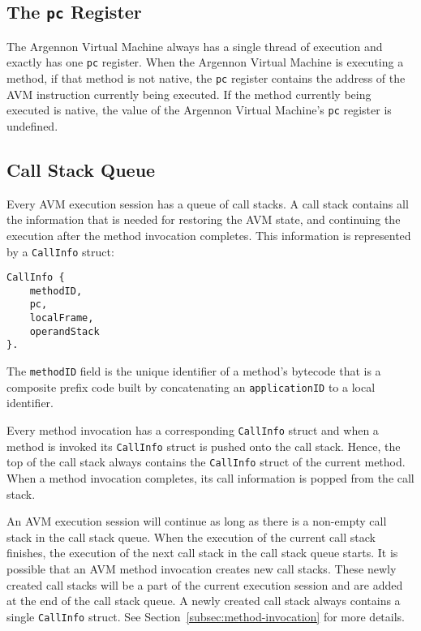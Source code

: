 \subsection{The \texttt{pc} Register}\label{subsec:the-pc-register}

The Argennon Virtual Machine always has a single thread of execution and exactly has one \texttt{pc} register.
When the Argennon Virtual Machine is executing a method, if that method is not native, the \texttt{pc} register
contains the address of the AVM instruction currently being executed. If the method currently being executed
is native, the value of the Argennon Virtual Machine's \texttt{pc} register is undefined.

\subsection{Call Stack Queue}\label{subsec:call-stack}

Every AVM execution session has a queue of call stacks. A call stack contains all the information that is needed for
restoring the AVM state, and continuing the execution after the method invocation completes.
This information is represented by a \texttt{CallInfo} struct:
\begin{verbatim}
CallInfo {
    methodID,
    pc,
    localFrame,
    operandStack
}.
\end{verbatim}

The \texttt{methodID} field is the unique identifier of a method's bytecode that
is a composite prefix code built by concatenating an \texttt{applicationID} to
a local identifier.

Every method invocation has a corresponding \texttt{CallInfo} struct and when a method is invoked its
\texttt{CallInfo} struct is pushed onto the call stack. Hence, the top of the call stack always contains
the \texttt{CallInfo} struct of the current method. When a method invocation completes, its call
information is popped from the call stack.

An AVM execution session will continue as long as there is a non-empty call stack in the call stack queue. When the
execution of the current call stack finishes, the execution of the next call stack in the call stack queue starts.
It is possible that an AVM method invocation creates new call stacks. These newly created call stacks will be a part
of the current execution session and are added at the end of the call stack queue. A newly created call stack always
contains a single \texttt{CallInfo} struct. See Section~\ref{subsec:method-invocation} for more details.

